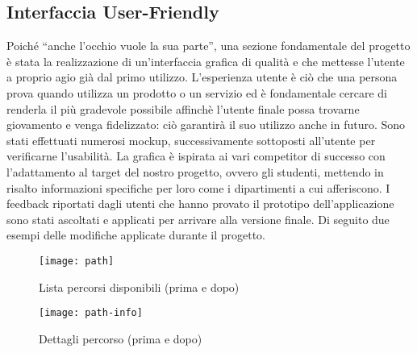 \subsection{Interfaccia User-Friendly}
Poiché “anche l’occhio vuole la sua parte”, una sezione fondamentale del progetto è stata la realizzazione di un’interfaccia grafica di qualità e che mettesse l’utente a proprio agio già dal primo utilizzo. L'esperienza utente è ciò che una persona prova quando utilizza un prodotto o un servizio ed è fondamentale cercare di renderla il più gradevole possibile affinchè l'utente finale possa trovarne giovamento e venga fidelizzato: ciò garantirà il suo utilizzo anche in futuro.
Sono stati effettuati numerosi mockup, successivamente sottoposti all’utente per verificarne l’usabilità. La grafica è ispirata ai vari competitor di successo con l'adattamento al target del nostro progetto, ovvero gli studenti, mettendo in risalto informazioni specifiche per loro come i dipartimenti a cui afferiscono.
I feedback riportati dagli utenti che hanno provato il prototipo dell’applicazione sono stati ascoltati e applicati per arrivare alla versione finale. Di seguito due esempi delle modifiche applicate durante il progetto.

\begin{figure}[!h]
  \centering
\begin{minipage}[c]{\linewidth}
  \centering
    \texttt{[image: path]}
  \caption{Lista percorsi disponibili (prima e dopo)}
  \label{fig:path}
\bigskip
  \centering
    \texttt{[image: path-info]}
  \caption{Dettagli percorso (prima e dopo)}
  \label{fig:path-info}
\end{minipage}
\end{figure}
\FloatBarrier


